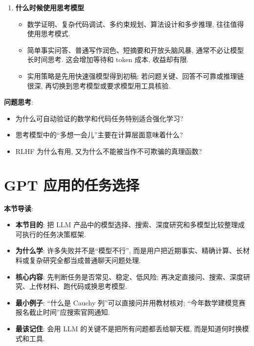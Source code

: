 \documentclass{../nndlcourse}
\begin{document}
\begin{enumerate}
\begin{itemize}
      \item 许多任务没有硬标准, 例如写诗、写笑话、改语气、总结材料. 对这些不可验证任务, 通常让人类比较候选回答, 再训练 reward model 预测人类偏好, 这就是 RLHF 的核心思想.
      \item RLHF 的优势是把“人觉得哪个好”转成可优化的信号. 人类从几段回答中排序, 往往比从零写出最佳回答更容易.
      \item 局限在于 reward model 只是人类偏好的近似. RL 很擅长钻奖励漏洞, 过度优化可能生成在人类看来很差、但奖励模型给高分的回答. 因此 RLHF 通常需要谨慎、有限地使用.
    \end{itemize}
  \item \textbf{什么时候使用思考模型}
    \begin{itemize}
      \item 数学证明、复杂代码调试、多约束规划、算法设计和多步推理, 往往值得使用思考模式.
      \item 简单事实问答、普通写作润色、短摘要和开放头脑风暴, 通常不必让模型长时间思考. 这会增加等待和 token 成本, 收益却有限.
      \item 实用策略是先用快速强模型得到初稿; 若问题关键、回答不可靠或推理链很深, 再切换到思考模型或要求模型用工具核验.
    \end{itemize}
\end{enumerate}

\textbf{问题思考}:
\begin{itemize}
  \item 为什么可自动验证的数学和代码任务特别适合强化学习?
  \item 思考模型中的“多想一会儿”主要在计算层面意味着什么?
  \item RLHF 为什么有用, 又为什么不能被当作不可欺骗的真理函数?
\end{itemize}

\section{GPT 应用的任务选择}

\textbf{本节导读}:
\begin{itemize}
  \item \textbf{本节目的}: 把 LLM 产品中的模型选择、搜索、深度研究和多模型比较整理成可执行的任务决策框架.
  \item \textbf{为什么学}: 许多失败并不是“模型不行”, 而是用户把近期事实、精确计算、长材料或复杂研究全都当成普通聊天问题处理.
  \item \textbf{核心内容}: 先判断任务是否常见、稳定、低风险; 再决定直接问、搜索、深度研究、上传材料、跑代码或换思考模型.
  \item \textbf{最小例子}: “什么是 Cauchy 列”可以直接问并用教材核对; “今年数学建模竞赛报名截止时间”应搜索官网通知.
  \item \textbf{最该记住}: 会用 LLM 的关键不是把所有问题都丢给聊天框, 而是知道何时换模式和工具.
\end{itemize}
\end{document}
